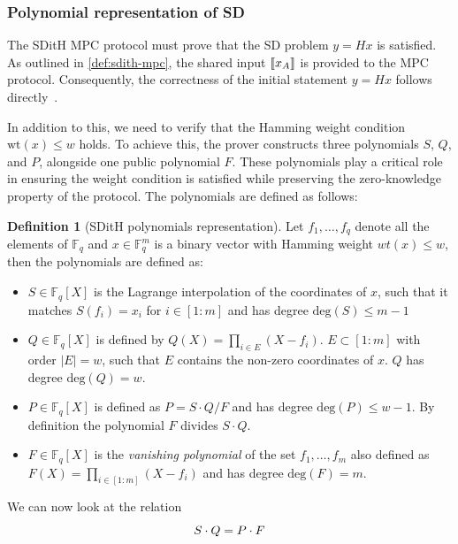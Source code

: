 \documentclass[11pt]{report}
\theoremstyle{definition}
\newtheorem{definition}{Definition}[section]
\theoremstyle{plain}
\begin{document}
\subsubsection{Polynomial representation of SD}\label{sec:polynomial_representation}

The SDitH MPC protocol must prove that the SD problem $ y = Hx $ is satisfied. As outlined in \autoref{def:sdith-mpc}, the shared input $\llbracket x_A \rrbracket$ is provided to the MPC protocol. Consequently, the correctness of the initial statement $ y = Hx $ follows directly~\cite{feneuil2022syndrome}.

In addition to this, we need to verify that the Hamming weight condition $ \text{wt}(x) \leq w $ holds. To achieve this, the prover constructs three polynomials $ S $, $ Q $, and $ P $, alongside one public polynomial $ F $. These polynomials play a critical role in ensuring the weight condition is satisfied while preserving the zero-knowledge property of the protocol. The polynomials are defined as follows:

\begin{definition}[SDitH polynomials representation]\label{def:sdith-polynomials}
  Let $f_1,\dots, f_q$ denote all the elements of $\mathbb{F}_q$ and $x\in \mathbb{F}^m_q$ is a binary vector with Hamming weight $wt(x) \leq w$, then the polynomials are defined as:
  \begin{itemize}
    \item $S\in \mathbb{F}_q[X]$ is the Lagrange interpolation of the coordinates of $x$, such that it matches $S(f_i) = x_i$ for $i\in [1:m]$ and has degree $\text{deg}(S) \leq m-1$
    \item $Q\in \mathbb{F}_q[X]$ is defined by $Q(X) = \prod_{i\in E}(X - f_i)$. $E \subset [1:m]$ with order $|E| = w$, such that $E$ contains the non-zero coordinates of $x$. $Q$ has degree $\text{deg}(Q) = w$.
    \item $P\in \mathbb{F}_q[X]$ is defined as $P = S\cdot Q/F$ and has degree $\text{deg}(P) \leq w-1$. By definition the polynomial $F$ divides $S\cdot Q$.
    \item $F\in \mathbb{F}_q[X]$ is the \textit{vanishing polynomial} of the set ${f_1, \dots, f_m}$ also defined as $F(X) = \prod_{i\in [1:m]}(X - f_i)$ and has degree $\text{deg}(F) = m$.
  \end{itemize}
\end{definition}

We can now look at the relation
\begin{equation}
  \centering
  S\cdot Q = P\cdot F\label{eq:polynomial_representation}
\end{equation}
\end{document}
